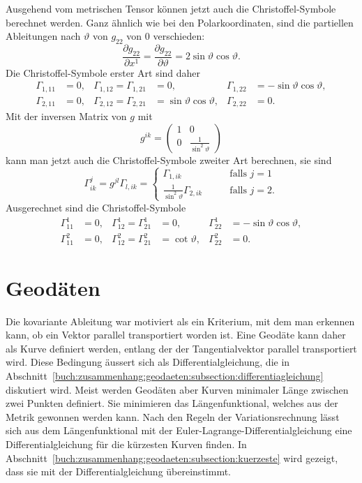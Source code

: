 \begin{beispiel}
Ausgehend vom metrischen Tensor können jetzt auch die Christoffel-Symbole
berechnet werden.
Ganz ähnlich wie bei den Polarkoordinaten, sind
die partiellen Ableitungen nach $\vartheta$ von $g_{22}$ von $0$
verschieden:
\[
\frac{\partial g_{22}}{\partial x^1}
=
\frac{\partial g_{22}}{\partial\vartheta}
=
2\sin\vartheta\cos\vartheta.
\]
Die Christoffel-Symbole erster Art sind daher
\[
\begin{aligned}
\Gamma_{1,11}
&=
0,
&
\Gamma_{1,12} = \Gamma_{1,21}
&=
0,
&
\Gamma_{1,22}
&=
-\sin\vartheta\cos\vartheta,
\\
\Gamma_{2,11}
&=
0,
&
\Gamma_{2,12} = \Gamma_{2,21}
&=
\sin\vartheta\cos\vartheta,
&
\Gamma_{2,22}
&=
0.
\end{aligned}
\]
Mit der inversen Matrix von $g$ mit
\[
g^{ik}
=
\begin{pmatrix}
1&0\\
0&\frac{1}{\sin^2\vartheta}
\end{pmatrix}
\]
kann man jetzt auch die Christoffel-Symbole zweiter Art berechnen,
sie sind
\[
\Gamma^j_{ik}
=
g^{jl}\Gamma_{l,ik}
=
\begin{cases}
\Gamma_{1,ik}&\qquad\text{falls $j=1$}\\
\frac{1}{\sin^2\vartheta}\Gamma_{2,ik}&\qquad\text{falls $j=2$}.
\end{cases}
\]
Ausgerechnet sind die Christoffel-Symbole
\[
\begin{aligned}
\Gamma^1_{11}
&=
0,
&
\Gamma^1_{12}
=
\Gamma^1_{21}
&=
0,
&
\Gamma^1_{22}
&=
-\sin\vartheta\cos\vartheta,
\\
\Gamma^2_{11}
&=
0,
&
\Gamma^2_{12}
=
\Gamma^2_{21}
&=
\cot\vartheta,
&
\Gamma^2_{22}
&=
0.
\end{aligned}
\]
\end{beispiel}

%
%
\section{Geodäten
\label{buch:zusammenhang:section:geodaeten}}
Die kovariante Ableitung war motiviert als ein Kriterium, mit
dem man erkennen kann, ob ein Vektor parallel transportiert
worden ist.
Eine Geodäte kann daher als Kurve definiert werden, entlang der
der Tangentialvektor parallel transportiert wird.
Diese Bedingung äussert sich als Differentialgleichung, die in
Abschnitt~\ref{buch:zusammenhang:geodaeten:subsection:differentiagleichung}
diskutiert wird.
Meist werden Geodäten aber Kurven minimaler Länge zwischen zwei Punkten
definiert.
Sie minimieren das Längenfunktional, welches aus der Metrik gewonnen
werden kann.
Nach den Regeln der Variationsrechnung lässt sich aus dem Längenfunktional
mit der Euler-Lagrange-Differentialgleichung eine Differentialgleichung
für die kürzesten Kurven finden.
In Abschnitt~\ref{buch:zusammenhang:geodaeten:subsection:kuerzeste}
wird gezeigt, dass sie mit der Differentialgleichung übereinstimmt.

